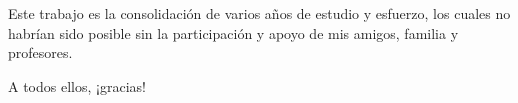 \begin{acknowledgements}
Este trabajo es la consolidación de varios años de estudio y esfuerzo, los cuales no habrían sido
posible sin la participación y apoyo de mis amigos, familia y profesores.

\begin{flushright}
A todos ellos, ¡gracias!
\end{flushright}
\end{acknowledgements}